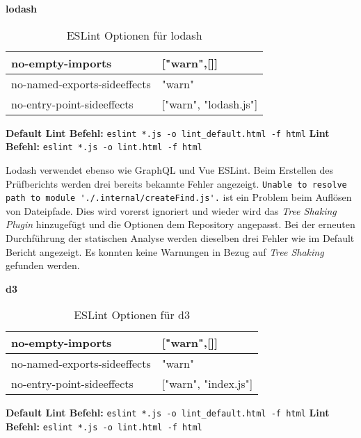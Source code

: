 \textbf{lodash}
\begin{table}[H]
\centering
\caption{ESLint Optionen für lodash}
\label{tbl:lodash-options}
\begin{tabular}{|l|l|}
\hline
no-empty-imports             & {[}"warn",{[}{]}{]}         \\ \hline
no-named-exports-sideeffects & "warn"                      \\ \hline
no-entry-point-sideeffects   & {[}"warn", "lodash.js"{]} \\ \hline
\end{tabular}
\end{table}

\begin{center}
\textbf{Default Lint Befehl:} \lstinline{eslint *.js -o lint_default.html -f html}\linebreak 
\textbf{Lint Befehl:} \lstinline{eslint *.js -o lint.html -f html}
\end{center}

Lodash verwendet ebenso wie GraphQL und Vue ESLint. Beim Erstellen des Prüfberichts werden drei bereits bekannte Fehler angezeigt. \lstinline{Unable to resolve path to module './.internal/createFind.js'.} ist ein Problem beim Auflösen von Dateipfade. Dies wird vorerst ignoriert und wieder wird das \textit{Tree Shaking Plugin} hinzugefügt und die Optionen dem Repository angepasst. Bei der erneuten Durchführung der statischen Analyse werden dieselben drei Fehler wie im Default Bericht angezeigt. Es konnten keine Warnungen in Bezug auf \textit{Tree Shaking} gefunden werden.

\textbf{d3}
\begin{table}[H]
\centering
\caption{ESLint Optionen für d3}
\label{tbl:d3-options}
\begin{tabular}{|l|l|}
\hline
no-empty-imports             & {[}"warn",{[}{]}{]}         \\ \hline
no-named-exports-sideeffects & "warn"                      \\ \hline
no-entry-point-sideeffects   & {[}"warn", "index.js"{]} \\ \hline
\end{tabular}
\end{table}

\begin{center}
\textbf{Default Lint Befehl:} \lstinline{eslint *.js -o lint_default.html -f html} \linebreak 
\textbf{Lint Befehl:} \lstinline{eslint *.js -o lint.html -f html}
\end{center}

